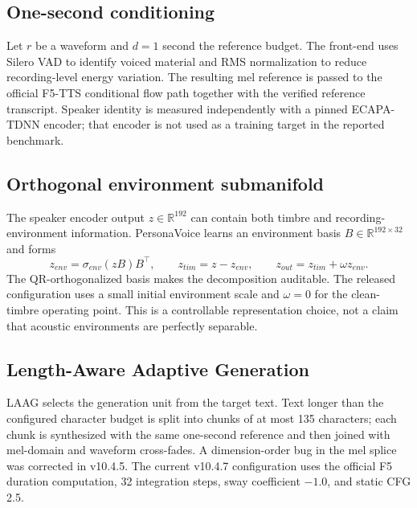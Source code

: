 \documentclass[10pt]{article}
\begin{document}
\subsection{One-second conditioning}

Let $r$ be a waveform and $d=1$ second the reference budget. The front-end
uses Silero VAD to identify voiced material and RMS normalization to reduce
recording-level energy variation. The resulting mel reference is passed to
the official F5-TTS conditional flow path together with the verified reference
transcript. Speaker identity is measured independently with a pinned
ECAPA-TDNN encoder; that encoder is not used as a training target in the
reported benchmark.

\subsection{Orthogonal environment submanifold}

The speaker encoder output $z\in\mathbb{R}^{192}$ can contain both timbre and
recording-environment information. PersonaVoice learns an environment basis
$B\in\mathbb{R}^{192\times32}$ and forms
\begin{equation}
 z_{env}=\sigma_{env}(zB)B^\top, \qquad z_{tim}=z-z_{env},
 \qquad z_{out}=z_{tim}+\omega z_{env}.
\end{equation}
The QR-orthogonalized basis makes the decomposition auditable. The released
configuration uses a small initial environment scale and $\omega=0$ for the
clean-timbre operating point. This is a controllable representation choice,
not a claim that acoustic environments are perfectly separable.

\subsection{Length-Aware Adaptive Generation}

LAAG selects the generation unit from the target text. Text longer than the
configured character budget is split into chunks of at most 135 characters;
each chunk is synthesized with the same one-second reference and then joined
with mel-domain and waveform cross-fades. A dimension-order bug in the mel
splice was corrected in v10.4.5. The current v10.4.7 configuration uses the
official F5 duration computation, 32 integration steps, sway coefficient
$-1.0$, and static CFG 2.5.
\end{document}
